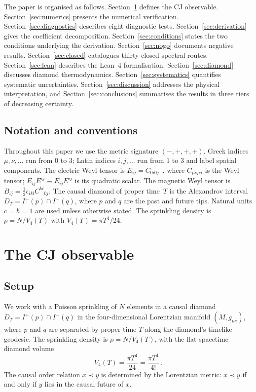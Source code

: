 \documentclass[12pt,a4paper]{article}
\theoremstyle{plain}
\theoremstyle{definition}
\theoremstyle{remark}
\newcommand{\Esq}{E_{ij}E^{ij}}
\begin{document}
The paper is organised as follows.  Section~\ref{sec:observable}
defines the CJ observable.  Section~\ref{sec:numerics} presents
the numerical verification.  Section~\ref{sec:diagnostics}
describes eight diagnostic tests.  Section~\ref{sec:derivation}
gives the coefficient decomposition.  Section~\ref{sec:conditions}
states the two conditions underlying the derivation.
Section~\ref{sec:nogo} documents negative results.
Section~\ref{sec:closed} catalogues thirty closed spectral routes.
Section~\ref{sec:lean} describes the Lean~4 formalisation.
Section~\ref{sec:diamond} discusses diamond thermodynamics.
Section~\ref{sec:systematics} quantifies systematic uncertainties.
Section~\ref{sec:discussion} addresses the physical interpretation,
and Section~\ref{sec:conclusions} summarises the results in three
tiers of decreasing certainty.

\subsection*{Notation and conventions}

Throughout this paper we use the metric signature $(-,+,+,+)$.
Greek indices $\mu, \nu, \ldots$ run from $0$ to $3$; Latin
indices $i, j, \ldots$ run from $1$ to $3$ and label spatial
components.  The electric Weyl tensor is
$E_{ij} = C_{0i0j}$~\cite{Ehlers:1961}, where $C_{\mu\nu\rho\sigma}$
is the Weyl tensor; $\Esq \equiv E_{ij}E^{ij}$ is its quadratic
scalar.  The magnetic Weyl tensor is
$B_{ij} = \frac{1}{2}\epsilon_{ikl}C^{kl}{}_{0j}$.  The causal
diamond of proper time~$T$ is the Alexandrov interval
$D_T = I^+(p) \cap I^-(q)$, where $p$ and $q$ are the past and
future tips.  Natural units $c = \hbar = 1$ are used unless
otherwise stated.  The sprinkling density is $\rho = N / V_4(T)$
with $V_4(T) = \pi T^4/24$.

\section{The CJ observable}
\label{sec:observable}

\subsection{Setup}
\label{sec:setup}

We work with a Poisson sprinkling of $N$ elements in a causal
diamond $D_T = I^+(p) \cap I^-(q)$ in the four-dimensional
Lorentzian manifold $(M, g_{\mu\nu})$, where $p$ and $q$ are
separated by proper time $T$ along the diamond's timelike
geodesic.  The sprinkling density is $\rho = N/V_4(T)$, with the
flat-spacetime diamond volume~\cite{GibbonsSolodukhin:2007}
\begin{equation}\label{eq:vol4}
  V_4(T) = \frac{\pi T^4}{24} = \frac{\pi T^4}{4!}\,.
\end{equation}
The causal order relation $x \prec y$ is determined by the
Lorentzian metric: $x \prec y$ if and only if $y$ lies in the
causal future of $x$.
\end{document}
